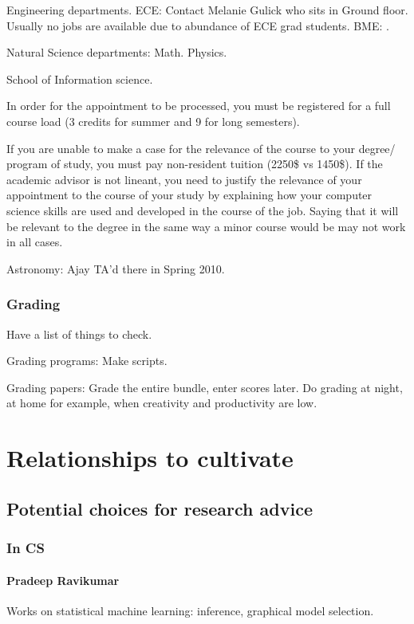 \documentclass[oneside, article]{memoir}
\begin{document}
\subitem Engineering departments.
\subsubitem ECE: Contact Melanie Gulick who sits in Ground floor. Usually no jobs are available due to abundance of ECE grad students.
\subsubitem BME: .

\subitem Natural Science departments:
\subsubitem Math.
\subsubitem Physics.

\subitem School of Information science.

In order for the appointment to be processed, you must be registered for a full course load (3 credits for summer and 9 for long semesters).

If you are unable to make a case for the relevance of the course to your degree/ program of study, you must pay non-resident tuition (2250\$ vs 1450\$). If the academic advisor is not lineant, you need to justify the relevance of your appointment to the course of your study by explaining how your computer science skills are used and developed in the course of the job. Saying that it will be relevant to the degree in the same way a minor course would be may not work in all cases.

Astronomy: Ajay TA'd there in Spring 2010.

\subsection{Grading}
\subitem Have a list of things to check.

\subitem Grading programs:
\subsubitem Make scripts.

\subitem Grading papers:
\subsubitem Grade the entire bundle, enter scores later.
\subsubitem Do grading at night, at home for example, when creativity and productivity are low.

\chapter{Relationships to cultivate}
\section{Potential choices for research advice}
\subsection{In CS}
\subsubsection{Pradeep Ravikumar}
Works on statistical machine learning: inference, graphical model selection.
\end{document}
